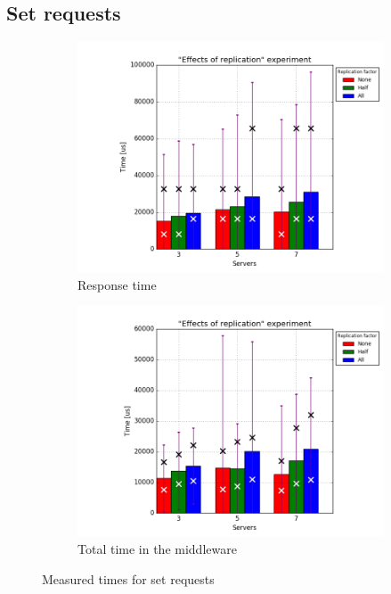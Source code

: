 \documentclass[11pt]{article}
\begin{document}
\subsection{Set requests}
\label{sec:replication-set}

\begin{figure}
\centering
\begin{subfigure}{.5\textwidth}
	\centering
	\includegraphics[width=\linewidth]{plots/replication-response_time-set}
	\caption{Response time}
	\label{fig:replication-response-time-set}
\end{subfigure}%
\begin{subfigure}{.5\textwidth}
	\centering
	\includegraphics[width=\linewidth]{plots/replication-set}
	\caption{Total time in the middleware}
	\label{fig:replication-set-middleware}
\end{subfigure}

\caption{Measured times for set requests}
\label{fig:replication-set}
\end{figure}
\end{document}
